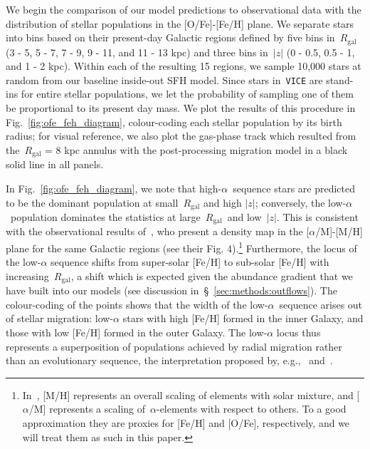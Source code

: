 \documentclass[draft2.tex]{subfiles}
\begin{document}
We begin the comparison of our model predictions to observational data with the 
distribution of stellar populations in the [O/Fe]-[Fe/H] plane. We separate 
stars into bins based on their present-day Galactic regions defined by five 
bins in~$R_\text{gal}$ (3 - 5, 5 - 7, 7 - 9, 9 - 11, and 11 - 13 kpc) and three 
bins in~$\left|z\right|$ (0 - 0.5, 0.5 - 1, and 1 - 2 kpc). Within each of the 
resulting 15 regions, we sample 10,000 stars at random from our baseline 
inside-out SFH model. Since stars in~\texttt{VICE} are stand-ins for entire 
stellar populations, we let the probability of sampling one of them be 
proportional to its present day mass. We plot the results of this procedure in 
Fig.~\ref{fig:ofe_feh_diagram}, colour-coding each stellar population by its 
birth radius; for visual reference, we also plot the gas-phase track which 
resulted from the~$R_\text{gal}$ = 8 kpc annulus with the post-processing 
migration model in a black solid line in all panels. 
\par 
In Fig.~\ref{fig:ofe_feh_diagram}, we note that high-$\alpha$~sequence stars 
are predicted to be the dominant population at small~$R_\text{gal}$ and high 
$\left|z\right|$; conversely, the low-$\alpha$~population dominates the 
statistics at large~$R_\text{gal}$~and low~$\left|z\right|$. This is consistent 
with the observational results of~\citet{Hayden2015}, who present a density map 
in the [$\alpha$/M]-[M/H] plane for the same Galactic regions (see their Fig. 
4).\footnote{
	In~\citet{Hayden2015}, [M/H] represents an overall scaling of elements with 
	solar mixture, and [$\alpha$/M] represents a scaling of~$\alpha$-elements 
	with respect to others. To a good approximation they are proxies for 
	[Fe/H] and [O/Fe], respectively, and we will treat them as such in this 
	paper. 
} 
Furthermore, the locus of the low-$\alpha$ sequence shifts from super-solar 
[Fe/H] to sub-solar [Fe/H] with increasing~$R_\text{gal}$, a shift which is 
expected given the abundance gradient that we have built into our models (see 
discussion in~\S~\ref{sec:methods:outflows}). 
The colour-coding of the points 
shows that the width of the low-$\alpha$~sequence arises out of 
stellar migration: low-$\alpha$ stars with high [Fe/H] formed in the inner 
Galaxy, and those with low [Fe/H] formed in the outer Galaxy. 
The low-$\alpha$ locus thus represents a superposition of populations achieved 
by radial migration rather than an evolutionary sequence, the interpretation 
proposed by, e.g.,~\citet{Schoenrich2009a} and~\citet{Nidever2014}. 
\par 
\end{document}
